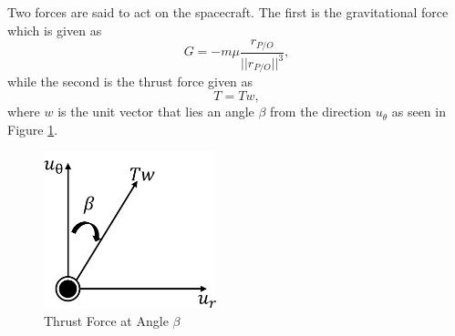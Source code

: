 \documentclass[]{article}
\begin{document}
	\noindent 
	Two forces are said to act on the spacecraft. The first is the gravitational force which is given as
	\begin{equation} \label{grav_force}
		G = -m\mu\frac{r_{P/O}}{||r_{P/O}||^3},
	\end{equation}
	while the second is the thrust force given as\\
	\begin{equation} \label{thrust_force}
		T = Tw,
	\end{equation}
	where \(w\) is the unit vector that lies an angle \(\beta\) from the direction \(u_{\theta}\) as seen in Figure \ref{fig:beta}.
	\begin{figure}
		\centering
		\includegraphics[width=50mm,scale=0.5]{beta.png}
		\caption{Thrust Force at Angle \(\beta\)}
		\label{fig:beta}
	\end{figure}
\end{document}
